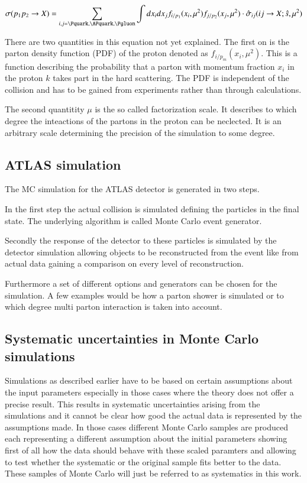 \begin{align}
	\sigma ( p_1 p_2 \rightarrow X ) = \sum_{i,j = \Pquark, \APquark, \Pgluon} \int dx_i dx_j f_{i/p_1} ( x_i, \mu^2 ) f_{j/p_2} ( x_j, \mu^2 ) \cdot \hat{\sigma}_{ij} ( ij \rightarrow X; \hat{s}, \mu^2 )
\end{align}

There are two quantities in this equation not yet explained.
The first on is the parton density function (PDF) of the proton denoted as $f_{i/p_m} ( x_i, \mu^2 )$. This is a function describing the probability that a parton with momentum fraction $x_i$ in the proton $k$ takes part in the hard scattering. The PDF is independent of the collision and has to be gained from experiments rather than through calculations.

The second quantitity $\mu$ is the so called factorization scale. It describes to which degree the inteactions of the partons in the proton can be neclected. It is an arbitrary scale determining the precision of the simulation to some degree.

\subsection{ATLAS simulation}

The MC simulation for the ATLAS detector is generated in two steps.~\cite{atlasmontecarlo}

In the first step the actual collision is simulated defining the particles in the final state. The underlying algorithm is called Monte Carlo event generator.

Secondly the response of the detector to these particles is simulated by the detector simulation allowing objects to be reconstructed from the event like from actual data gaining a comparison on every level of reconstruction.

Furthermore a set of different options and generators can be chosen for the simulation. A few examples would be how a parton shower is simulated or to which degree multi parton interaction is taken into account.

\subsection{Systematic uncertainties in Monte Carlo simulations}

Simulations as described earlier have to be based on certain assumptions about the input parameters especially in those cases where the theory does not offer a precise result. This results in systematic uncertainties arising from the simulations and it cannot be clear how good the actual data is represented by the assumptions made.
In those cases different Monte Carlo samples are produced each representing a different assumption about the initial parameters showing first of all how the data should behave with these scaled paramters and allowing to test whether the systematic or the original sample fits better to the data. 
These samples of Monte Carlo will just be referred to as systematics in this work.

